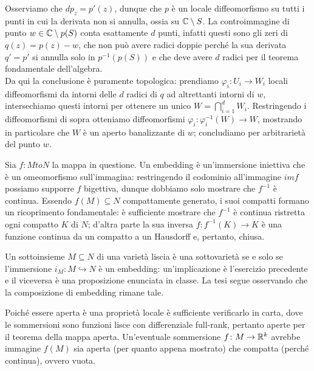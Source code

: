\documentclass[a4paper]{article}
\begin{document}
\begin{ex}[1.4]
	Osserviamo che $ dp_z= p'(z) $, dunque che $ p $ è un locale diffeomorfismo su tutti i punti in cui la derivata non si annulla, ossia su $ \mathbb{C} \setminus S $. La controimmagine di punto $ w \in \mathbb{C} \setminus p(S) $ conta esattamente $ d $ punti, infatti questi sono gli zeri di $ q(z) = p(z)-w $, che non può avere radici doppie perché la sua derivata $ q' = p' $ si annulla solo in $ p^{-1}(p(S)) $ e che deve avere $ d $ radici per il teorema fondamentale dell'algebra. \\
	
	Da qui la conclusione è puramente topologica: prendiamo $ \varphi_i\colon U_i \to W_i $ locali diffeomorfismi da intorni delle $ d $ radici di $ q $ ad altrettanti intorni di $ w $, intersechiamo questi intorni per ottenere un unico $ W = \bigcap_{i = 1}^d W_i $. Restringendo i diffeomorfismi di sopra otteniamo diffeomorfismi $ \varphi_i\colon \varphi_i^{-1}(W) \to W $, mostrando in particolare che $ W $ è un aperto banalizzante di $ w $; concludiamo per arbitrarietà del punto $ w $.
\end{ex}

\begin{ex}[2.1]
	Sia $ f\colon M to N $ la mappa in questione. Un embedding è un'immersione iniettiva che è un omeomorfismo sull'immagina: restringendo il codominio all'immagine $ im f $ possiamo supporre $ f $ bigettiva, dunque dobbiamo solo mostrare che $ f^{-1} $ è continua. Essendo $ f(M) \subseteq N $ compattamente generato, i suoi compatti formano un ricoprimento fondamentale: è sufficiente mostrare che $ f^{-1} $ è continua ristretta ogni compatto $ K $ di $ N $; d'altra parte la sua inversa $ f\colon f^{-1}(K) \to K $ è una funzione continua da un compatto a un Hausdorff e, pertanto, chiusa.
\end{ex}

\begin{ex}[2.3]
	Un sottoinsieme $ M \subseteq N $ di una varietà liscia è una sottovarietà se e solo se l'immersione $ i_M\colon M \hookrightarrow N $ è un embedding: un'implicazione è l'esercizio precedente e il viceversa è una proposizione enunciata in classe. La tesi segue osservando che la composizione di embedding rimane tale.
\end{ex}

\begin{ex}[2.4]
	Poiché essere aperta è una proprietà locale è sufficiente verificarlo in carta, dove le sommersioni sono funzioni lisce con differenziale full-rank, pertanto aperte per il teorema della mappa aperta. Un'eventuale sommersione $ f \colon M \to \mathbb{R}^k $ avrebbe immagine $ f(M) $ sia aperta (per quanto appena mostrato) che compatta (perché continua), ovvero vuota.
\end{ex}
\end{document}
